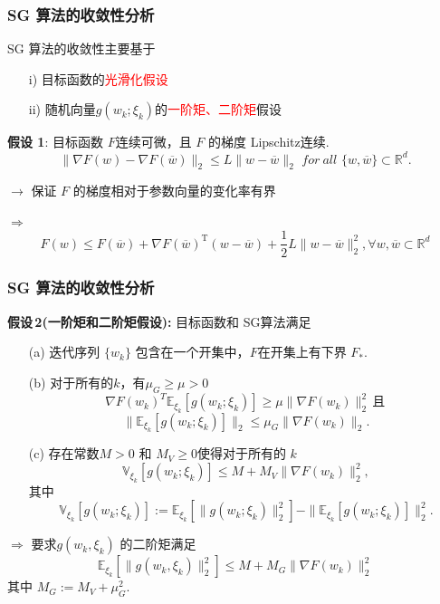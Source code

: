 \documentclass[handout]{beamer}
\begin{document}
\begin{frame}
\frametitle {SG 算法的收敛性分析}

SG 算法的收敛性主要基于
\begin{itemize}
  \item[i)] 目标函数的\textcolor{red}{光滑化假设}
  \item[ii)] 随机向量$g(w_k;\xi_k)$的\textcolor{red}{一阶矩、二阶矩}假设
\end{itemize}

\bigskip

\textbf{假设 1}:
目标函数 $F$连续可微，且 $F$ 的梯度 Lipschitz连续.
$$\|\nabla F(w) - \nabla F(\overline w)\|_2\leq L\|w - \overline w\|_2 \,\, for \ all\,\, \{w, \overline w\} \subset \mathbb{R}^d.$$

$\rightarrow$ 保证 $F$ 的梯度相对于参数向量的变化率有界

$\Rightarrow$
$$
 F(w) \leqslant F(\overline{w})+\nabla F(\overline{w})^{\mathrm{T}}(w-\overline{w})+\frac{1}{2} L\|w-\overline{w}\|_2^2, \forall w, \overline{w} \subset \mathbb{R}^d
$$

\end{frame}

\begin{frame}
\frametitle {SG 算法的收敛性分析}

\textbf{假设\,2(一阶矩和二阶矩假设):} 
目标函数和 SG算法满足
\begin{itemize}
  \item[(a)] 迭代序列 $\{w_k\}$ 包含在一个开集中，$F$在开集上有下界 $F_*$.

  \item[(b)] 对于所有的$k$，有$\mu_G \geq \mu > 0$  
  $$\nabla F(w_k)^T \mathbb{E}_{\xi_k}[g(w_k; \xi_k)] \geq \mu\|\nabla F(w_k)\|^2_2 \,\text{且}\,$$
  $$\|\mathbb{E}_{\xi_k}[g(w_k; \xi_k)]\|_2\leq \mu_G\|\nabla F(w_k)\|_2.$$
  \item[(c)] 存在常数$M> 0$ 和 $M_V \geq 0$使得对于所有的 $k$
  $$\mathbb{V}_{\xi_k}[g(w_k; \xi_k)] \leq M + M_V \|\nabla F(w_k)\|^2_2,$$
  其中
  $$\mathbb{V}_{\xi_k}[g(w_k; \xi_k)] := \mathbb{E}_{\xi_k}[\|g(w_k; \xi_k)\|^2_2] - \|\mathbb{E}_{\xi_k}[g(w_k; \xi_k)]\|^2_2.$$
 \end{itemize}

 $\Rightarrow$ 要求$g(w_k, \xi_k)$ 的二阶矩满足
 $$\mathbb{E}_{\xi_k}[\|g(w_k, \xi_k)\|^2_2] \leq M + M_G\|\nabla F(w_k)\|^2_2$$
  其中 $M_G := M_V + \mu^2_G.$
\end{frame}
\end{document}
